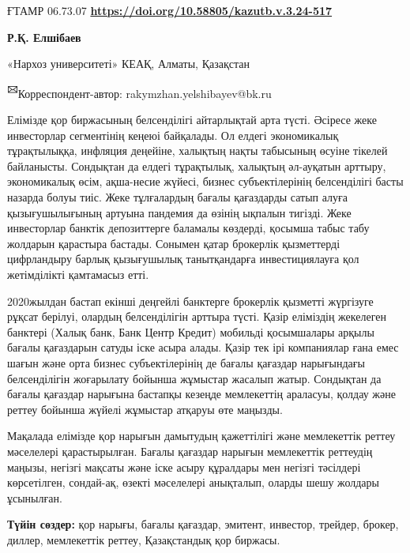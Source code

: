 \newpage
ҒТАМР 06.73.07
\hfill {\bfseries \href{https://doi.org/10.58805/kazutb.v.3.24-517}{https://doi.org/10.58805/kazutb.v.3.24-517}}


\begin{center}
{\bfseries Р.Қ. Елшібаев}

«Нархоз университеті» КЕАҚ, Алматы, Қазақстан
\end{center}

{\bfseries \textsuperscript{🖂}}Корреспондент-автор:
rakymzhan.yelshibayev@bk.ru

Елімізде қор биржасының белсенділігі айтарлықтай арта түсті. Әсіресе
жеке инвесторлар сегментінің кеңеюі байқалады. Ол елдегі экономикалық
тұрақтылыққа, инфляция деңейіне, халықтың нақты табысының өсуіне тікелей
байланысты. Сондықтан да елдегі тұрақтылық, халықтың әл-ауқатын арттыру,
экономикалық өсім, ақша-несие жүйесі, бизнес субъектілерінің
белсенділігі басты назарда болуы тиіс. Жеке тұлғалардың бағалы
қағаздарды сатып алуға қызығушылығының артуына пандемия да өзінің
ықпалын тигізді. Жеке инвесторлар банктік депозиттерге баламалы
көздерді, қосымша табыс табу жолдарын қарастыра бастады. Сонымен қатар
брокерлік қызметтерді цифрландыру барлық қызығушылық танытқандарға
инвестициялауға қол жетімділікті қамтамасыз етті.

2020жылдан бастап екінші деңгейлі банктерге брокерлік қызметті жүргізуге
рұқсат берілуі, олардың белсенділігін арттыра түсті. Қазір еліміздің
жекелеген банктері (Халық банк, Банк Центр Кредит) мобильді қосымшалары
арқылы бағалы қағаздарын сатуды іске асыра алады. Қазір тек ірі
компаниялар ғана емес шағын және орта бизнес субъектілерінің де бағалы
қағаздар нарығындағы белсенділігін жоғарылату бойынша жұмыстар жасалып
жатыр. Сондықтан да бағалы қағаздар нарығына бастапқы кезеңде
мемлекеттің араласуы, қолдау және реттеу бойынша жүйелі жұмыстар атқаруы
өте маңызды.

Мақалада елімізде қор нарығын дамытудың қажеттілігі және мемлекеттік
реттеу мәселелері қарастырылған. Бағалы қағаздар нарығын мемлекеттік
реттеудің маңызы, негізгі мақсаты және іске асыру құралдары мен негізгі
тәсілдері көрсетілген, сондай-ақ, өзекті мәселелері анықталып, оларды
шешу жолдары ұсынылған.

{\bfseries Түйін сөздер:} қор нарығы, бағалы қағаздар, эмитент, инвестор,
трейдер, брокер, диллер, мемлекеттік реттеу, Қазақстандық қор биржасы.

